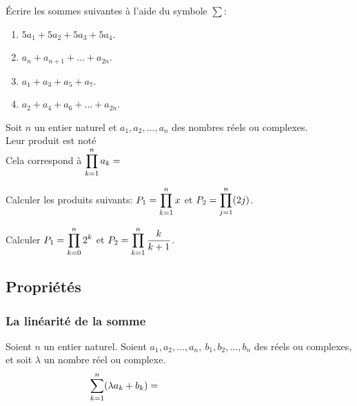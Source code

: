 \documentclass[a4paper, 11pt,reqno]{article}
\begin{document}
{\footnotesize 
\begin{exercice} \'Ecrire les sommes suivantes \`{a} l'aide du symbole $\sum$:
\begin{enumerate}
\item $5a_{1}+5a_2+5a_3+5a_4$.
\item $a_n+a_{n+1}+\dots+a_{2n}$.
\item $a_1+a_3+a_5+a_7$.
\item $a_2+a_4+a_6+\dots+a_{2n}$.
\end{enumerate}
\end{exercice}}



\begin{defi} 
Soit $n$ un entier naturel et $a_1,a_2,\dots,a_n$ des nombres r\'eels ou complexes. \\
Leur produit est not\'e \dotfill \phantom{\hspace{8cm}}\\
\noindent Cela correspond \`a $\displaystyle \prod\limits_{k=1}^n a_k=$\dotfill \phantom{\hspace{5cm}}
\end{defi}


\begin{exemples}
Calculer les produits suivants: $P_1=\displaystyle\prod\limits_{k=1}^n x$ et $P_2=\displaystyle\prod\limits_{j=1}^n (2j)$.
\end{exemples}

{\footnotesize 
\begin{exercice} 
Calculer $\displaystyle P_1=\prod_{k=0}^n 2^k$ et $P_2=\displaystyle \prod_{k=1}^n \frac{k}{k+1}$.
\end{exercice}}



\subsection{Propriétés}

\subsubsection{La lin\'earit\'e de la somme}
\begin{prop} 
Soient $n$ un entier naturel. 
Soient $a_1,a_2,\dots,a_n,\ b_1,b_2,\dots, b_n$ des r\'eels ou complexes, et soit $\lambda$ un nombre r\'eel ou complexe.
$$\ddp \sum\limits_{k=1}^n (\lambda a_k+b_k)=\hspace*{4cm}$$
\end{prop}
\end{document}
